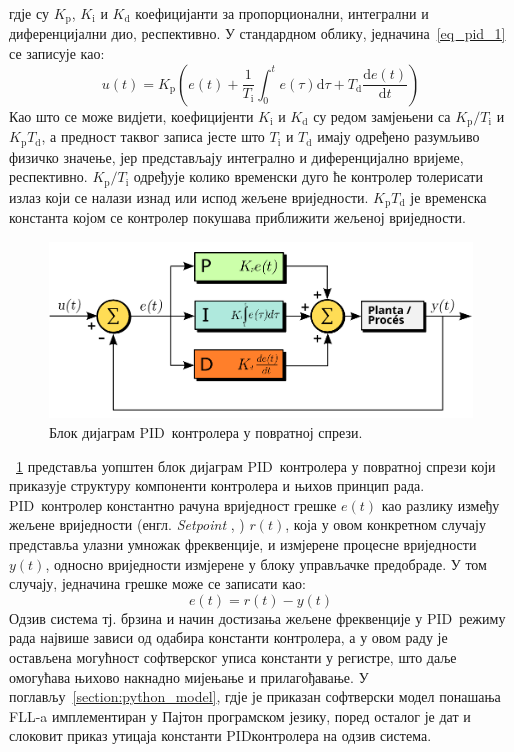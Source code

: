\documentclass[master]{finthesis}
\makeatletter
\newcommand*{\engl}[2][\@empty]{%
    \edef\theacronym{#1}%
    (енгл. \foreignlanguage{english}{\emph{#2}%
    \ifx\theacronym\@empty \else , #1\fi})%
}
\def \FLL  {FLL} %
\def \PID  {PID} %
\makeatother
\begin{document}
гдје су $K_\text{p}$, $K_\text{i}$ и $K_\text{d}$ коефицијанти за пропорционални, интегрални и диференцијални дио, респективно. У стандардном облику, једначина~\ref{eq_pid_1} се записује као:
\begin{equation} 
	\label{eq_pid_2}
	u(t)= K_\text{p}\left(e(t) + \frac{1}{T_\text{i}}\int_{0}^{t}e(\tau)\text{d}\tau + T_\text{d}\frac{\text{d}e(t)}{\text{d}t}\right)
\end{equation}
Као што се може видјети, коефицијенти $K_\text{i}$ и $K_\text{d}$ су редом замјењени са $K_\text{p}/T_\text{i}$ и $K_\text{p}T_\text{d}$, а предност таквог записа јесте што $T_\text{i}$ и $T_\text{d}$ имају одређено разумљиво физичко значење, јер представљају интегрално и диференцијално вријеме, респективно. $K_\text{p}/T_\text{i}$ одређује колико временски дуго ће контролер толерисати излаз који се налази изнад или испод жељене вриједности. $K_\text{p}T_\text{d}$ је временска константа којом се контролер покушава приближити жељеној вриједности.
\begin{figure}[!h]
	 \centering
	 \includegraphics[scale=0.3]{slike/pid.png}
	 \caption{Блок дијаграм \PID\ контролера у повратној спрези.}
	 \label{pid_img}
\end{figure}
\figurename~\ref{pid_img} представља уопштен блок дијаграм \PID\ контролера у повратној спрези који приказује структуру компоненти контролера и њихов принцип рада. \PID\ контролер константно рачуна вриједност грешке $e(t)$ као разлику између жељене вриједности \engl{Setpoint} $r(t)$, која у овом конкретном случају представља улазни умножак фреквенције, и измјерене процесне вриједности $y(t)$, односно вриједности измјерене у блоку управљачке предобраде. У том случају, једначина грешке може се записати као:
\begin{equation} 
	\label{eq_pid_err)}
	e(t) = r(t) - y(t)
\end{equation}
Одзив система тј. брзина и начин достизања жељене фреквенције у \PID\ режиму рада највише зависи од одабира константи контролера, а у овом раду је остављена могућност софтверског уписа константи у регистре, што даље омогућава њихово накнадно мијењање и прилагођавање. У поглављу~\ref{section:python_model}, гдје је приказан софтверски модел понашања \FLL-a имплементиран у Пајтон програмском језику, поред осталог је дат и слоковит приказ утицаја константи \PID контролера на одзив система.
\end{document}
